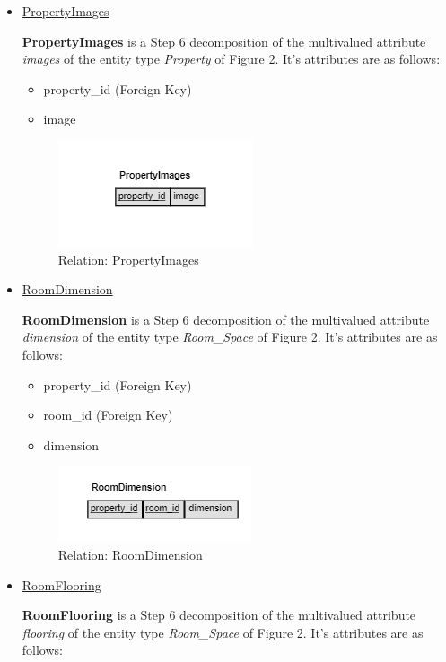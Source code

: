 \documentclass[12pt,a4paper]{report}
\begin{document}
\begin{itemize}
\item \underline{PropertyImages} \par 
\textbf{PropertyImages} is a Step 6 decomposition of the multivalued attribute \textit{images} of the entity type \textit{Property} of Figure 2. It's attributes are as follows:

\begin{itemize}
\item property\_id (Foreign Key)  
\item image 
\end{itemize}

\begin{figure}[H]
\centering
\includegraphics[scale=1.5]{img.png}
\caption{Relation: PropertyImages}
\label{Figure:img}
\end{figure}

\item \underline{RoomDimension} \par 
\textbf{RoomDimension} is a Step 6 decomposition of the multivalued attribute \textit{dimension} of the entity type \textit{Room\_Space} of Figure 2. It's attributes are as follows:

\begin{itemize}
\item property\_id (Foreign Key)  
\item room\_id (Foreign Key)
\item dimension 
\end{itemize}

\begin{figure}[H]
\centering
\includegraphics[scale=1.5]{rmdim.png}
\caption{Relation: RoomDimension}
\label{Figure:rmdim}
\end{figure}

\item \underline{RoomFlooring} \par 
\textbf{RoomFlooring} is a Step 6 decomposition of the multivalued attribute \textit{flooring} of the entity type \textit{Room\_Space} of Figure 2. It's attributes are as follows:


\end{itemize}
\end{document}
